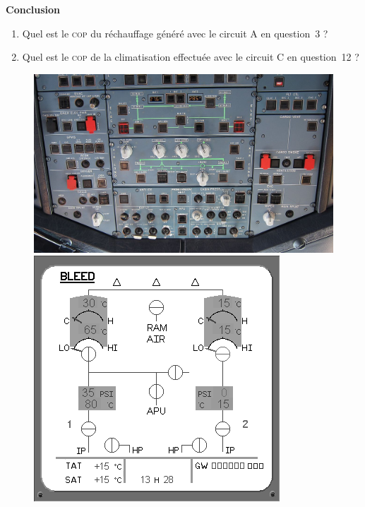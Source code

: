 \textbf{Conclusion}
	
	\begin{enumerate}
		\item Quel est le \textsc{cop} du réchauffage généré avec le circuit A en question~3 ?
		\item Quel est le \textsc{cop} de la climatisation effectuée avec le circuit C en question~12 ?
	\end{enumerate}

	\onlyframabook{\pagebreak}
	\begin{figure}[h!]
		\begin{center}
			\includegraphics[width=\textwidth]{images/320_panel.jpg}
			\includegraphics[width=\textwidth]{images/320_efis.png}
		\end{center}
		\label{fig_320_ecs}
	\end{figure}	


